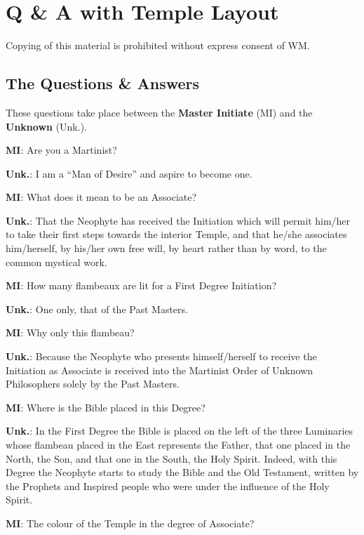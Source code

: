 \section{Q \& A with Temple Layout}



Copying of this material is prohibited without express consent of WM.

\subsection{The Questions \& Answers}

These questions take place between the \textbf{Master Initiate} (MI) and the \textbf{Unknown} (Unk.).

\newcommand{\mi}{\textbf{MI}:}

\newcommand{\unk}{\textbf{Unk.}:}

\mi{}	Are you a Martinist? 

\unk{}	I am a ``Man of Desire'' and aspire to become one. 

\mi{}	What does it mean to be an Associate? 

\unk{}	That the Neophyte has received the Initiation which will permit him/her to take their first steps towards the interior Temple, and that he/she associates him/herself, by his/her own free will, by heart rather than by word, to the common mystical work. 

\mi{}	How many flambeaux are lit for a First Degree Initiation? 

\unk{}	One only, that of the Past Masters. 

\mi{}	Why only this flambeau? 

\unk{}	Because the Neophyte who presents himself/herself to receive the Initiation as Associate is received into the Martinist Order of Unknown Philosophers solely by the Past Masters. 

\mi{}	Where is the Bible placed in this Degree? 

\unk{}	In the First Degree the Bible is placed on the left of the three Luminaries whose flambeau placed in the East represents the Father, that one placed in the North, the Son, and that one in the South, the Holy Spirit. Indeed, with this Degree the Neophyte starts to study the Bible and the Old Testament, written by the Prophets and Inspired people who were under the influence of the Holy Spirit. 

\mi{}	The colour of the Temple in the degree of Associate? 

